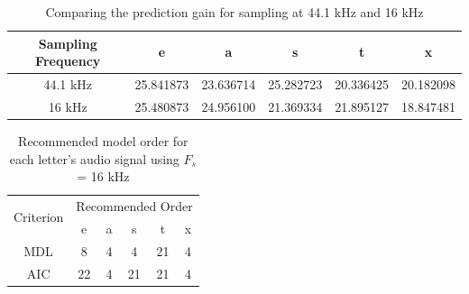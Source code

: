 \documentclass{article}
\begin{document}
\begin{table}[h!]
\centering
\begin{tabular}{|c|c|c|c|c|c|}
\hline
Sampling Frequency & e         & a         & s         & t         & x         \\ \hline
44.1 kHz           & 25.841873 & 23.636714 & 25.282723 & 20.336425 & 20.182098 \\ \hline
16 kHz             & 25.480873 & 24.956100 & 21.369334 & 21.895127 & 18.847481 \\ \hline
\end{tabular}
\caption{Comparing the prediction gain for sampling at 44.1 kHz and 16 kHz}
\label{tab:pred_gain}
\end{table}


\begin{table}[h!]
\centering
\begin{tabular}{|c|c|c|c|c|c|}
\hline
\multirow{2}{*}{Criterion} & \multicolumn{5}{c|}{Recommended Order} \\ \cline{2-6} 
                           & e      & a     & s     & t     & x     \\ \hline
MDL                        & 8      & 4     & 4     & 21     & 4     \\ \hline
AIC                        & 22      &4     & 21     & 21     & 4     \\ \hline
\end{tabular}
\caption{Recommended model order for each letter's audio signal using $F_s$ = 16 kHz}
\label{tab:speech_mdl_16k}
\end{table}
\end{document}

